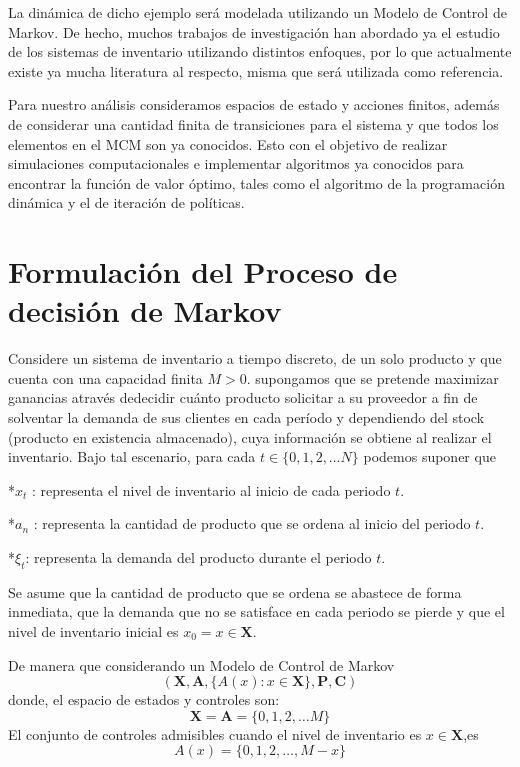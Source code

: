 \documentclass[
  letterpaper,
  DIV=11,
  numbers=noendperiod]{scrreprt}
\begin{document}
La dinámica de dicho ejemplo será modelada utilizando un Modelo de
Control de Markov. De hecho, muchos trabajos de investigación han
abordado ya el estudio de los sistemas de inventario utilizando
distintos enfoques, por lo que actualmente existe ya mucha literatura al
respecto, misma que será utilizada como referencia.

Para nuestro análisis consideramos espacios de estado y acciones
finitos, además de considerar una cantidad finita de transiciones para
el sistema y que todos los elementos en el MCM son ya conocidos. Esto
con el objetivo de realizar simulaciones computacionales e implementar
algoritmos ya conocidos para encontrar la función de valor óptimo, tales
como el algoritmo de la programación dinámica y el de iteración de
políticas.


\chapter{Formulación del Proceso de decisión de
Markov}\label{formulaciuxf3n-del-proceso-de-decisiuxf3n-de-markov}

Considere un sistema de inventario a tiempo discreto, de un solo
producto y que cuenta con una capacidad finita \(M>0\). supongamos que
se pretende maximizar ganancias através dedecidir cuánto producto
solicitar a su proveedor a fin de solventar la demanda de sus clientes
en cada período y dependiendo del stock (producto en existencia
almacenado), cuya información se obtiene al realizar el inventario. Bajo
tal escenario, para cada \(t\in \{0,1,2, \dotso N\}\) podemos suponer
que

*\(x_t\) : representa el nivel de inventario al inicio de cada periodo
\(t\).

*\(a_n\) : representa la cantidad de producto que se ordena al inicio
del periodo \(t\).

*\(\xi_t\): representa la demanda del producto durante el periodo \(t\).

Se asume que la cantidad de producto que se ordena se abastece de forma
inmediata, que la demanda que no se satisface en cada periodo se pierde
y que el nivel de inventario inicial es \(x_0=x \in \mathbf{X}\).

De manera que considerando un Modelo de Control de Markov
\[( \mathbf{X}, \mathbf{A}, \{A(x): x \in \mathbf{X}\}, \mathbf{P},\mathbf{C})\]
donde, el espacio de estados y controles son:
\[\mathbf{X}=\mathbf{A}=\{0,1,2, \dotso M\}\] El conjunto de controles
admisibles cuando el nivel de inventario es \(x\in\mathbf{X}\),es
\[A(x)=\{0,1,2, \dotso,M-x\}\]
\end{document}
